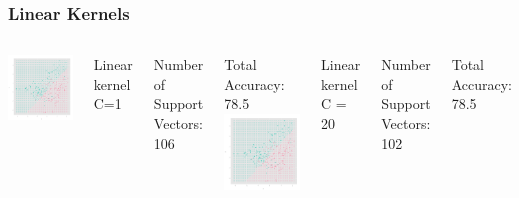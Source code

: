 \documentclass{beamer}
\begin{document}
\begin{frame}
\frametitle{Linear Kernels}
\begin{columns}[c] %
		\includegraphics{linc1.png}
		
		Linear kernel C=1

		Number of Support Vectors:  106

		Total Accuracy: 78.5 
		\includegraphics{linc20.png}
		
		Linear kernel C = 20
		
		Number of Support Vectors:  102
		
		Total Accuracy: 78.5 
	\end{columns}
\end{frame}
 
\end{document}

